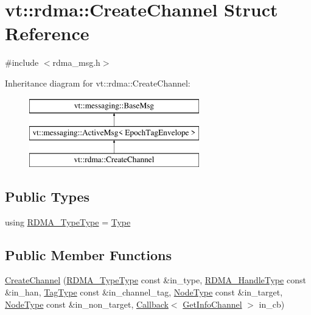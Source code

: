 \hypertarget{structvt_1_1rdma_1_1_create_channel}{}\section{vt\+:\+:rdma\+:\+:Create\+Channel Struct Reference}
\label{structvt_1_1rdma_1_1_create_channel}


{\ttfamily \#include $<$rdma\+\_\+msg.\+h$>$}

Inheritance diagram for vt\+:\+:rdma\+:\+:Create\+Channel\+:\begin{figure}[H]
\begin{center}
\leavevmode
\includegraphics[height=3.000000cm]{structvt_1_1rdma_1_1_create_channel}
\end{center}
\end{figure}
\subsection*{Public Types}
\begin{DoxyCompactItemize}
\item 
using \hyperlink{structvt_1_1rdma_1_1_create_channel_ae16004f4d4886e470c8e896fca551afd}{R\+D\+M\+A\+\_\+\+Type\+Type} = \hyperlink{namespacevt_1_1rdma_ac848e1d9da43db6294bd06f83e5d3946}{Type}
\end{DoxyCompactItemize}
\subsection*{Public Member Functions}
\begin{DoxyCompactItemize}
\item 
\hyperlink{structvt_1_1rdma_1_1_create_channel_ad3c3265c63c536dfb68e30886438bdf8}{Create\+Channel} (\hyperlink{namespacevt_1_1rdma_ac848e1d9da43db6294bd06f83e5d3946}{R\+D\+M\+A\+\_\+\+Type\+Type} const \&in\+\_\+type, \hyperlink{namespacevt_a10442579ec4e7ebef223818e64bcf908}{R\+D\+M\+A\+\_\+\+Handle\+Type} const \&in\+\_\+han, \hyperlink{namespacevt_a84ab281dae04a52a4b243d6bf62d0e52}{Tag\+Type} const \&in\+\_\+channel\+\_\+tag, \hyperlink{namespacevt_a866da9d0efc19c0a1ce79e9e492f47e2}{Node\+Type} const \&in\+\_\+target, \hyperlink{namespacevt_a866da9d0efc19c0a1ce79e9e492f47e2}{Node\+Type} const \&in\+\_\+non\+\_\+target, \hyperlink{namespacevt_a36db99df4c973d48b1118a293fff533f}{Callback}$<$ \hyperlink{structvt_1_1rdma_1_1_get_info_channel}{Get\+Info\+Channel} $>$ in\+\_\+cb)
\end{DoxyCompactItemize}
